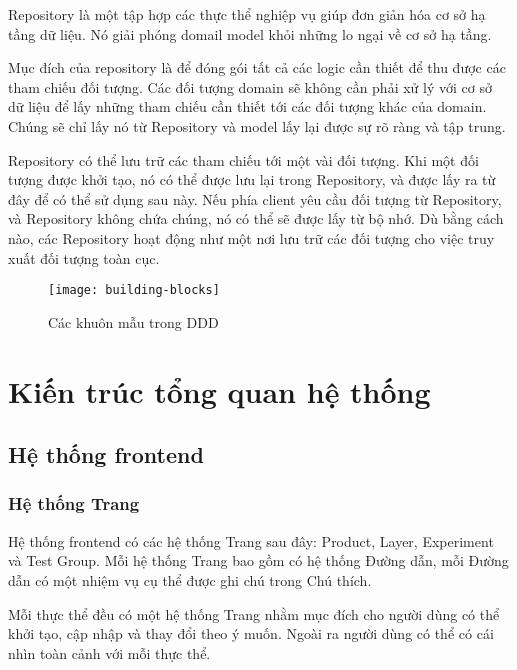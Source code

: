 Repository là một tập hợp các thực thể nghiệp vụ giúp đơn giản hóa cơ sở hạ tầng dữ liệu. Nó giải phóng domail model khỏi những lo ngại về cơ sở hạ tầng.

Mục đích của repository là để đóng gói tất cả các logic cần thiết để thu được các tham chiếu đối tượng. Các đối tượng domain sẽ không cần phải xử lý với cơ sở dữ liệu để lấy những tham chiếu cần thiết tới các đối tượng khác của domain. Chúng sẽ chỉ lấy nó từ Repository và model lấy lại được sự rõ ràng và tập trung.

Repository có thể lưu trữ các tham chiếu tới một vài đối tượng. Khi một đối tượng được khởi tạo, nó có thể được lưu lại trong Repository, và được lấy ra từ đây để có thể sử dụng sau này. Nếu phía client yêu cầu đối tượng từ Repository, và Repository không chứa chúng, nó có thể sẽ được lấy từ bộ nhớ. Dù bằng cách nào, các Repository hoạt động như một nơi lưu trữ các đối tượng cho việc truy xuất đối tượng toàn cục.

\begin{figure}[H]
	\centering
	\texttt{[image: building-blocks]}
	\caption{Các khuôn mẫu trong DDD}
\end{figure}

\section{Kiến trúc tổng quan hệ thống}

\subsection{Hệ thống frontend}

\subsubsection{Hệ thống Trang}

Hệ thống frontend có các hệ thống Trang sau đây: Product, Layer, Experiment và Test Group. Mỗi hệ thống Trang bao gồm có hệ thống Đường dẫn, mỗi Đường dẫn có một nhiệm vụ cụ thể được ghi chú trong Chú thích.

Mỗi thực thể đều có một hệ thống Trang nhằm mục đích cho người dùng có thể khởi tạo, cập nhập và thay đổi theo ý muốn. Ngoài ra người dùng có thể có cái nhìn toàn cảnh với mỗi thực thể.

